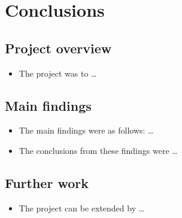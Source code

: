 \documentclass[12pt,a4paper]{article}
\begin{document}
\newpage
\section{Conclusions}
\subsection{Project overview}
\begin{itemize}
    \item The project was to \dots
\end{itemize}

\subsection{Main findings}
\begin{itemize}
    \item The main findings were as follows: \dots
    \item The conclusions from these findings were \dots
\end{itemize}

\subsection{Further work}
\begin{itemize}
    \item The project can be extended by \dots
\end{itemize}

\newpage

\end{document}
